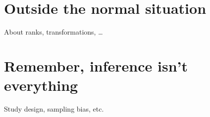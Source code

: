 \documentclass[]{book}
\begin{document}
\hypertarget{outside-the-normal-situation}{%
\chapter{Outside the normal situation}\label{outside-the-normal-situation}}

About ranks, transformations, \ldots{}

\hypertarget{remember-inference-isnt-everything}{%
\chapter{Remember, inference isn't everything}\label{remember-inference-isnt-everything}}

Study design, sampling bias, etc.


\end{document}

